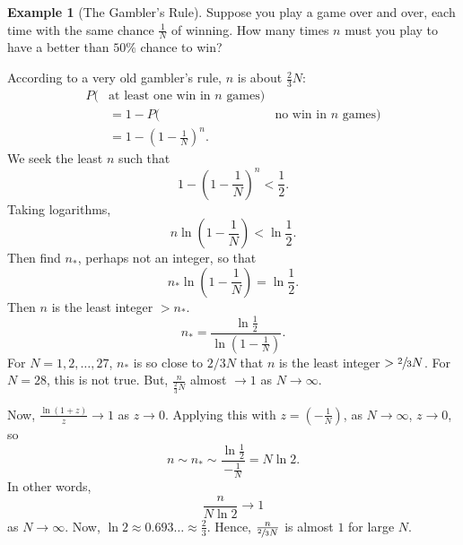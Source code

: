 \documentclass{article}
\newcommand{\p}[1]{\left(#1\right)} %
\theoremstyle{definition}
\newtheorem*{example}{Example}
\begin{document}
\begin{example}[The Gambler's Rule]
Suppose you play a game over and over, each time with the same chance $\frac{1}{N}$ of winning. How many times $n$ must you play to have a better than $50\%$ chance to win?

According to a very old gambler's rule, $n$ is about $\frac{2}{3}N$:
\begin{align*}
    P(&\text{at least one win in } n \text{ games}) \\
        &= 1 - P(&\text{no win in } n \text{ games}) \\
        &= 1 - \p{1- \frac{1}{N}}^n.
\end{align*}
We seek the least $n$ such that
\[
    1 - \p{1 - \frac{1}{N}}^n < \frac{1}{2}.
\]
Taking logarithms,
\[
    n \ln\p{1 - \frac{1}{N}} < \ln \frac{1}{2}.
\]
Then find $n_*$, perhaps not an integer, so that
\[
    n_*\ln\p{1 - \frac{1}{N}} = \ln \frac{1}{2}.
\]
Then $n$ is the least integer $> n_*$.
\[
    n_* = \frac{\ln \frac{1}{2}}{\ln\p{1 - \frac{1}{N}}}.
\]
For $N =1, 2, \dots, 27$, $n_*$ is so close to $2/3 N$ that $n$ is the least integer $> \sfrac23 N$. For $N = 28$, this is not true. But, $\frac{n}{\frac23 N}$ almost $\rightarrow 1$ as $N \rightarrow \infty$. 

Now, $\frac{\ln(1+z)}{z} \to 1$ as $z \to 0$. Applying this with $z = (-\frac{1}{N})$, as $N \to \infty$, $z \to 0$, so
\[
    n \sim n_* \sim \frac{\ln \frac{1}{2}}{-\frac{1}{N}} = N\ln 2.
\]
In other words, $$\frac{n}{N \ln 2} \rightarrow 1 $$ as $N \rightarrow \infty$. 
Now, $\ln 2 \approx 0.693\dots \approx \frac{2}{3}$.
Hence, $\frac{n}{\sfrac{2}{3} N}$ is almost $1$ for large $N$. 
\end{example}
\end{document}
